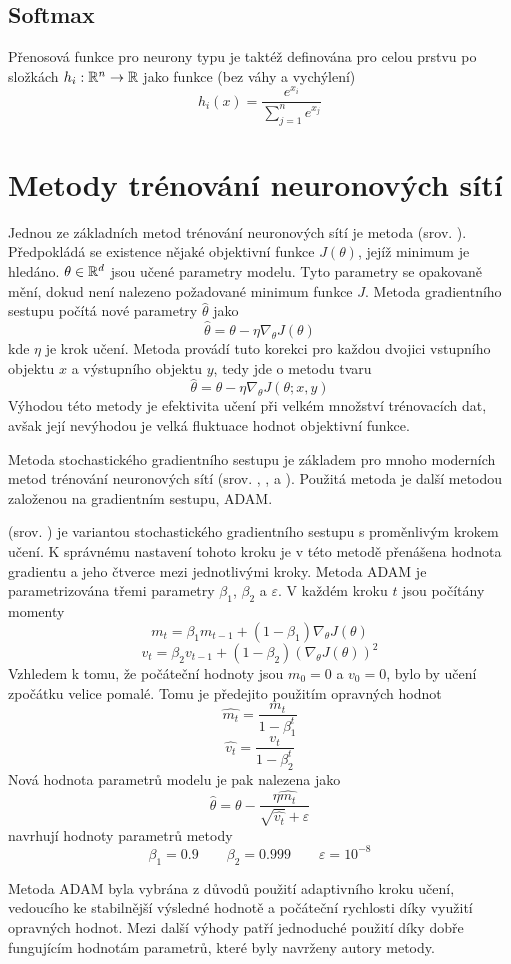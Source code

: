\subsection{Softmax}
Přenosová funkce pro neurony typu  je taktéž definována pro celou prstvu po složkách \( h_i : \mathbb R^n \to \mathbb R \) jako funkce (bez váhy a vychýlení)
\[ h_i \left( x \right) = \frac{e^{x_i}}{\sum_{j = 1}^n e^{x_j}} \]

\section{Metody trénování neuronových sítí}
Jednou ze základních metod trénování neuronových sítí je metoda  (srov. \cite{cauchy_methode_1847}). Předpokládá se existence nějaké objektivní funkce \( J \left( \theta \right) \), jejíž minimum je hledáno. \( \theta \in \mathbb R^d \) jsou učené parametry modelu. Tyto parametry se opakovaně mění, dokud není nalezeno požadované minimum funkce \( J \). Metoda gradientního sestupu počítá nové parametry \( \hat \theta \) jako
\[ \hat \theta = \theta - \eta \nabla_{\theta} J \left( \theta \right) \]
kde \( \eta \) je krok učení. Metoda  provádí tuto korekci pro každou dvojici vstupního objektu \( x \) a výstupního objektu \( y \), tedy jde o metodu tvaru
\[ \hat \theta = \theta - \eta \nabla_{\theta} J \left( \theta; x, y \right) \]
Výhodou této metody je efektivita učení při velkém množství trénovacích dat, avšak její nevýhodou je velká fluktuace hodnot objektivní funkce.

Metoda stochastického gradientního sestupu je základem pro mnoho moderních metod trénování neuronových sítí (srov. \cite{duchi_adaptive_2011}, \cite{zeiler_adadelta:_2012}, \cite{tieleman_lecture_2012} a \cite{kingma_adam:_2014}). Použitá metoda je další metodou založenou na gradientním sestupu, ADAM.

 (srov. \cite{kingma_adam:_2014}) je variantou stochastického gradientního sestupu s proměnlivým krokem učení. K správnému nastavení tohoto kroku je v této metodě přenášena hodnota gradientu a jeho čtverce mezi jednotlivými kroky. Metoda ADAM je parametrizována třemi parametry \( \beta_1 \), \( \beta_2 \) a \( \varepsilon \). V každém kroku \( t \) jsou počítány momenty
\[ m_t = \beta_1 m_{t - 1} + \left( 1 - \beta_1 \right) \nabla_{\theta} J \left( \theta \right) \]
\[ v_t = \beta_2 v_{t - 1} + \left( 1 - \beta_2 \right) \left( \nabla_{\theta} J \left( \theta \right) \right)^2 \]
Vzhledem k tomu, že počáteční hodnoty jsou \( m_0 = 0 \) a \( v_0 = 0 \), bylo by učení zpočátku velice pomalé. Tomu je předejito použitím opravných hodnot
\[ \hat{m_t} = \frac{m_t}{1 - \beta_1^t} \]
\[ \hat{v_t} = \frac{v_t}{1 - \beta_2^t} \]
Nová hodnota parametrů modelu je pak nalezena jako
\[ \hat \theta = \theta - \frac{\eta \hat{m_t}}{\sqrt{\hat{v_t}} + \varepsilon} \]
\cite{kingma_adam:_2014} navrhují hodnoty parametrů metody
\[ \beta_1 = 0.9 \qquad \beta_2 = 0.999 \qquad \varepsilon = 10^{-8} \]

Metoda ADAM byla vybrána z důvodů použití adaptivního kroku učení, vedoucího ke stabilnější výsledné hodnotě a počáteční rychlosti díky využití opravných hodnot. Mezi další výhody patří jednoduché použití díky dobře fungujícím hodnotám parametrů, které byly navrženy autory metody.
